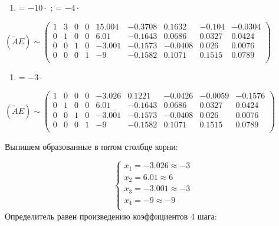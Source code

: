 \documentclass[10pt, a4paper]{scrartcl}
\begin{document}
\begin{enumerate}
\def\labelenumi{\arabic{enumi})}
\setcounter{enumi}{5}
\itemsep1pt\parskip0pt
\item
  \uppercase\expandafter{} =
  \uppercase\expandafter{}\(- 10 \cdot\)
  \uppercase\expandafter{};
  \uppercase\expandafter{} =
  \uppercase\expandafter{}
  \(- 4 \cdot\)\uppercase\expandafter{}
\end{enumerate}

\(\displaystyle (\widetilde{A}E) \sim \begin{pmatrix} 1 & 3 & 0 & 0 & 15.004 & -0.3708 & 0.1632 & -0.104 & -0.0304\\ 0 & 1 & 0 & 0 & 6.01 & -0.1643 & 0.0686 & 0.0327 & 0.0424\\ 0 & 0 & 1 & 0 & -3.001 & -0.1573 & -0.0408 & 0.026 & 0.0076\\ 0 & 0 & 0 & 1 & -9 & -0.1582 & 0.1071 & 0.1515 & 0.0789\\ \end{pmatrix}\)

\begin{enumerate}
\def\labelenumi{\arabic{enumi})}
\setcounter{enumi}{6}
\itemsep1pt\parskip0pt
\item
  \uppercase\expandafter{} =
  \uppercase\expandafter{}
  \(- 3 \cdot\)\uppercase\expandafter{}
\end{enumerate}

\(\displaystyle (\widetilde{A}E) \sim \begin{pmatrix} 1 & 0 & 0 & 0 & -3.026 & 0.1221 & -0.0426 & -0.0059 & -0.1576\\ 0 & 1 & 0 & 0 & 6.01 & -0.1643 & 0.0686 & 0.0327 & 0.0424\\ 0 & 0 & 1 & 0 & -3.001 & -0.1573 & -0.0408 & 0.026 & 0.0076\\ 0 & 0 & 0 & 1 & -9 & -0.1582 & 0.1071 & 0.1515 & 0.0789\\ \end{pmatrix}\)

Выпишем образованные в пятом столбце корни:

\[\begin{cases}
x_1 = -3.026 \approx -3\\
x_2 = 6.01 \approx 6\\
x_3 = -3.001 \approx -3\\
x_4 = -9 \approx -9\\
\end{cases}\] \vspace{5mm} Определитель равен произведению коэффициентов
4 шага:
\end{document}
